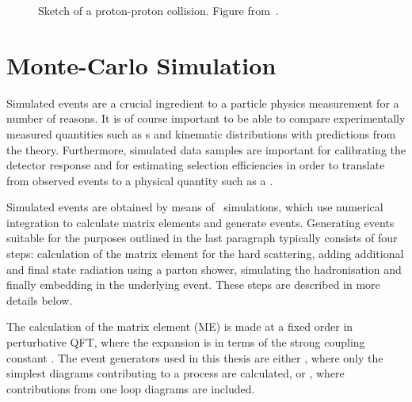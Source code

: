 \begin{figure}
\centering
        \vspace{-5mm}
    \caption{\small
Sketch of a proton-proton collision. Figure from~\cite{Campbell:2006wx}.
}
    \label{fig:pp-event}
\end{figure}

\section{Monte-Carlo Simulation}
\label{sec:Theory-MC}

Simulated events are a crucial ingredient to a particle physics
measurement for a number of reasons. It is of course important to be able to
compare experimentally measured quantities such as \cx s and kinematic
distributions with predictions from the theory. Furthermore, simulated data
samples are important for calibrating the detector response and for estimating
selection efficiencies in order to translate from observed events
to a physical quantity such as a \cx. 

Simulated events are obtained by
means of \mc\ simulations, which use numerical integration to calculate matrix
elements and generate events. Generating events suitable for the purposes
outlined in the last paragraph typically consists of four steps:
calculation of the matrix element for the hard scattering, adding additional and
final state radiation using a parton shower,
simulating the hadronisation and finally embedding in the underlying event. These steps are described
in more details below. 

The calculation of the matrix element (ME) is
made at a fixed order in perturbative QFT, where the expansion is in terms of
the strong coupling constant \alphaS. The event generators used in this thesis
are either , where only the simplest diagrams
contributing to a process are calculated, or ,
where contributions from one loop diagrams are included. 

